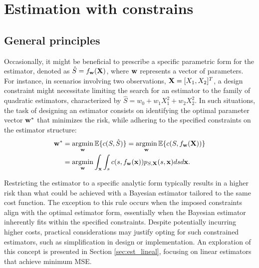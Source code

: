 \section{Estimation with constrains}


\subsection{General principles}

Occasionally, it might be beneficial to prescribe a specific parametric form for the estimator, denoted as $\hat S = f_{\bf w}(\bf X)$, where ${\bf w}$ represents a vector of parameters. For instance, in scenarios involving two observations, ${\bf X} = [X_1, X_2]^T$, a design constraint might necessitate limiting the search for an estimator to the family of quadratic estimators, characterized by $\hat S = w_0 + w_1 X_1^2 + w_2 X_2^2$. In such situations, the task of designing an estimator consists on identifying the optimal parameter vector ${\bf w}^*$ that minimizes the risk, while adhering to the specified constraints on the estimator structure:
\begin{align}
{\bf w}^* &= \operatorname*{argmin}_{\bf w} \mathbb{E}\{c(S,\hat S)\}
           = \operatorname*{argmin}_{\bf w} \mathbb{E}\{c(S,f_{\bf w}({\bf X}))\} \nonumber\\
          &= \operatorname*{argmin}_{\bf w} \int_{\bf x} \int_s c(s,f_{\bf w}({\bf x})) 
                                                 p_{S,{\bf X}}(s,{\bf x}) ds d{\bf x}.
\end{align}

Restricting the estimator to a specific analytic form typically results in a higher risk than what could be achieved with a Bayesian estimator tailored to the same cost function. The exception to this rule occurs when the imposed constraints align with the optimal estimator form, essentially when the Bayesian estimator inherently fits within the specified constraints. Despite potentially incurring higher costs, practical considerations may justify opting for such constrained estimators, such as simplification in design or implementation. An exploration of this concept is presented in Section \ref{sec:est_lineal}, focusing on linear estimators that achieve minimum MSE.

